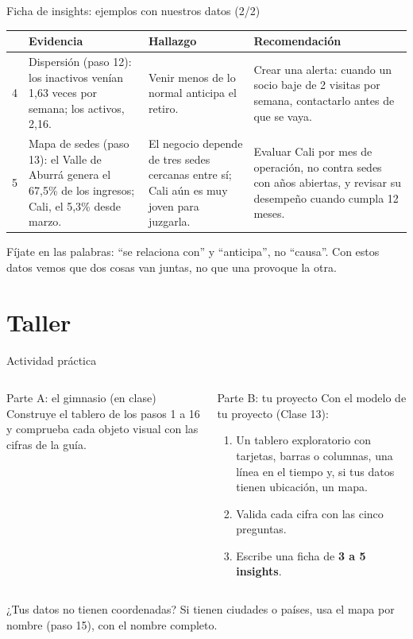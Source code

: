 \documentclass[aspectratio=169,11pt]{beamer}
\begin{document}
\begin{frame}[t]{Ficha de insights: ejemplos con nuestros datos (2/2)}
  \scriptsize
  \renewcommand{\arraystretch}{1.25}
  \begin{tabular}{@{}L{0.3cm}L{3.9cm}L{4.1cm}L{4.4cm}@{}}
    \toprule
    & \textbf{Evidencia} & \textbf{Hallazgo} & \textbf{Recomendación} \\
     & Dispersión (paso 12): los inactivos venían 1,63 veces por semana; los activos, 2,16. & Venir menos de lo normal anticipa el retiro. & Crear una alerta: cuando un socio baje de 2 visitas por semana, contactarlo antes de que se vaya. \\
    5 & Mapa de sedes (paso 13): el Valle de Aburrá genera el 67,5\% de los ingresos; Cali, el 5,3\% desde marzo. & El negocio depende de tres sedes cercanas entre sí; Cali aún es muy joven para juzgarla. & Evaluar Cali por mes de operación, no contra sedes con años abiertas, y revisar su desempeño cuando cumpla 12 meses. \\
    \bottomrule
  \end{tabular}
  \vspace{0.2cm}

  \small Fíjate en las palabras: ``se relaciona con'' y ``anticipa'', no
  ``causa''. Con estos datos vemos que dos cosas van juntas, no que una
  provoque la otra.
\end{frame}

\section{Taller}
\begin{frame}[t]{Actividad práctica}
  \begin{columns}[T,onlytextwidth]
    \begin{block}{Parte A: el gimnasio (en clase)}
      \small Construye el tablero de los pasos 1 a 16 y comprueba cada
      objeto visual con las cifras de la guía.
    \end{block}
    \begin{alertblock}{Parte B: tu proyecto}
      \small Con el modelo de tu proyecto (Clase 13):
      \begin{enumerate}
        \footnotesize
        \item Un tablero exploratorio con tarjetas, barras o columnas, una
          línea en el tiempo y, si tus datos tienen ubicación, un mapa.
        \item Valida cada cifra con las cinco preguntas.
        \item Escribe una ficha de \textbf{3 a 5 insights}.
      \end{enumerate}
    \end{alertblock}
  \end{columns}
  \vspace{0.1cm}
  \footnotesize ¿Tus datos no tienen coordenadas? Si tienen ciudades o
  países, usa el mapa por nombre (paso 15), con el nombre completo.
\end{frame}
\end{document}
